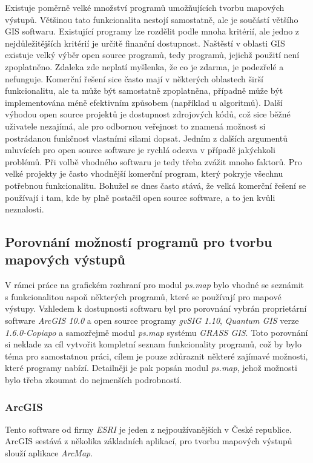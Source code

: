\documentclass[a4paper,12pt,draft]{article}
\newcommand{\modul}[1]{\emph{#1}}
\begin{document}
Existuje poměrně velké množství programů umožňujících tvorbu
mapových výstupů. Většinou tato funkcionalita nestojí samostatně,
ale je součástí většího GIS softwaru. Existující programy lze
rozdělit podle mnoha kritérií, ale jedno z nejdůležitějších
kritérií je určitě finanční dostupnost. Naštěstí v oblasti GIS
existuje velký výběr open source programů, tedy programů, jejichž
použití není zpoplatněno. Zdaleka zde neplatí myšlenka, že co je
zdarma, je podezřelé a nefunguje. Komerční řešení sice často mají v
některých oblastech širší funkcionalitu, ale ta může být samostatně
zpoplatněna, případně může být implementována méně efektivním
způsobem (například u algoritmů). Další výhodou open source projektů
je dostupnost zdrojových kódů, což sice běžné uživatele nezajímá,
ale pro odbornou veřejnost to znamená možnost si postrádanou funkčnost
vlastními silami dopsat. Jedním z dalších argumentů mluvících pro open
source software je rychlá odezva v případě jakýchkoli problémů. Při
volbě vhodného softwaru je tedy třeba zvážit mnoho faktorů. Pro
velké projekty je často vhodnější komerční program, který pokryje
všechnu potřebnou funkcionalitu. Bohužel se dnes často stává, že
velká komerční řešení se používají i tam, kde by plně postačil
open source software, a to jen kvůli neznalosti.


\subsection{Porovnání možností programů pro tvorbu mapových výstupů}
V rámci práce na grafickém rozhraní pro modul \modul{ps.map} bylo
vhodné se seznámit s funkcionalitou aspoň některých programů, které
se používají pro mapové výstupy. Vzhledem k dostupnosti softwaru byl
pro porovnání vybrán proprietární software \emph{ArcGIS 10.0} a
open source programy \emph{gvSIG 1.10}, \emph{Quantum GIS} verze
\emph{1.6.0-Copiapo} a samozřejmě modul \modul{ps.map} systému \emph{GRASS
GIS}.
Toto porovnání si neklade za cíl vytvořit kompletní seznam
funkcionality programů, což by bylo téma pro samostatnou práci,
cílem je pouze zdůraznit některé zajímavé možnosti, které programy
nabízí. Detailněji je pak popsán modul \modul{ps.map}, jehož možnosti
bylo třeba zkoumat do nejmenších podrobností.

\subsubsection{ArcGIS}
\label{sec:porovnani_moznosti:ArcGIS}
Tento software od firmy \emph{ESRI} je jeden z nejpoužívanějších v
České republice. ArcGIS sestává z několika základních aplikací,
pro tvorbu mapových výstupů slouží aplikace \emph{ArcMap}.
\end{document}
